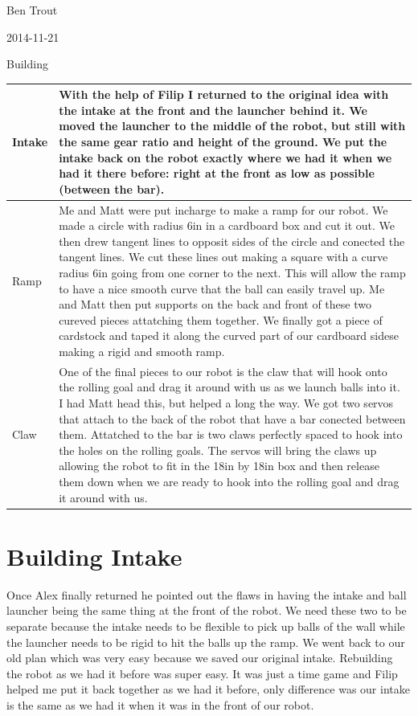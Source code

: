 Ben Trout

2014-11-21

Building  

\begin{tabular}{|p{5cm}|p{5cm}|}
\hline
 Intake&
With the help of Filip I returned to the original idea with the intake at the front and the launcher behind it. We moved the launcher to the middle of the robot, but still with the same gear ratio and height of the ground. We put the intake back on the robot exactly where we had it when we had it there before: right at the front as low as possible (between the bar).
\\
\hline
Ramp&
Me and Matt were put incharge to make a ramp for our robot. We made a circle with radius 6in in a cardboard box and cut it out. We then drew tangent lines to opposit sides of the circle and conected the tangent lines. We cut these lines out making a square with a curve radius 6in going from one corner to the next. This will allow the ramp to have a nice smooth curve that the ball can easily travel up. Me and Matt then put supports on the back and front of these two cureved pieces attatching them together. We finally got a piece of cardstock and taped it along the curved part of our cardboard sidese making a rigid and smooth ramp. 
\\
\hline
Claw&
One of the final pieces to our robot is the claw that will hook onto the rolling goal and drag it around with us as we launch balls into it. I had Matt head this, but helped a long the way. We got two servos that attach to the back of the robot that have a bar conected between them. Attatched to the bar is two claws perfectly spaced to hook into the holes on the rolling goals. The servos will bring the claws up allowing the robot to fit in the 18in by 18in box and then release them down when we are ready to hook into the rolling goal and drag it around with us. 
\\
\hline
\end{tabular}

\section*{Building Intake}
Once Alex finally returned he pointed out the flaws in having the intake and ball launcher being the same thing at the front of the robot. We need these two to be separate because the intake needs to be flexible to pick up balls of the wall while the launcher needs to be rigid to hit the balls up the ramp. We went back to our old plan which was very easy because we saved our original intake. Rebuilding the robot as we had it before was super easy. It was just a time game and Filip helped me put it back together as we had it before, only difference was our intake is the same as we had it when it was in the front of our robot. 

